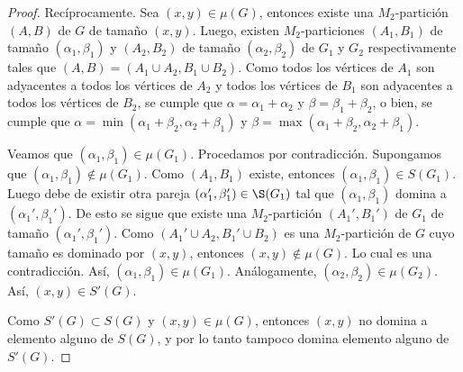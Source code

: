 \begin{proof}
Recíprocamente. Sea $(x,y)\in\mu(G)$, entonces existe una $M_2$-partición $(A,B)$ de $G$ de tamaño $(x,y)$. Luego, existen $M_2$-particiones $(A_1,B_1)$ de tamaño $(\alpha_1, \beta_1)$ y $(A_2,B_2)$ de tamaño $(\alpha_2, \beta_2)$ de $G_1$ y $G_2$ respectivamente tales que $(A,B)=(A_1\cup A_2, B_1 \cup B_2)$. Como todos los vértices de $A_1$ son adyacentes a todos los vértices de $A_2$ y todos los vértices de $B_1$ son adyacentes a todos los vértices de $B_2$, se cumple que $\alpha = \alpha_1+\alpha_2$ y $\beta = \beta_1 + \beta_2$, o bien, se cumple que $\alpha = \min (\alpha_1+\beta_2, \alpha_2+\beta_1)$ y $\beta = \max (\alpha_1+\beta_2, \alpha_2+\beta_1)$.

Veamos que $(\alpha_1, \beta_1)\in\mu(G_1)$. Procedamos por contradicción. Supongamos que $(\alpha_1, \beta_1)\notin\mu(G_1)$. Como $(A_1,B_1)$ existe, entonces $(\alpha_1, \beta_1)\in S(G_1)$. Luego debe de existir otra pareja $(\alpha_1', \beta_1')\in\S(G_1)$ tal que $(\alpha_1, \beta_1)$ domina a $(\alpha_1', \beta_1')$. De esto se sigue que existe una $M_2$-partición $(A_1',B_1')$ de $G_1$ de tamaño $(\alpha_1', \beta_1')$. Como $(A_1'\cup A_2, B_1'\cup B_2)$ es una $M_2$-partición de $G$ cuyo tamaño es dominado por $(x,y)$, entonces $(x,y)\notin\mu(G)$. Lo cual es una contradicción. Así, $(\alpha_1, \beta_1)\in\mu(G_1)$. Análogamente, $(\alpha_2, \beta_2)\in\mu(G_2)$. Así, $(x,y)\in S'(G)$.

Como $S'(G)\subset S(G)$ y $(x,y)\in\mu(G)$, entonces $(x,y)$ no domina a elemento alguno de $S(G)$, y por lo tanto tampoco domina elemento alguno de $S'(G)$.

\end{proof}
